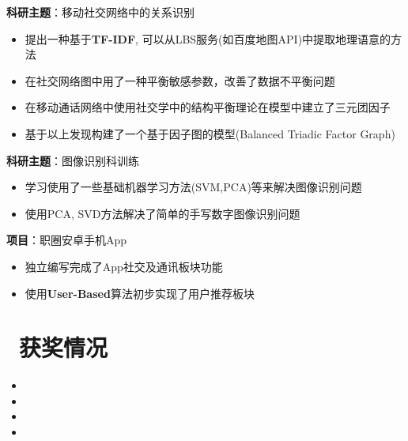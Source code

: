 \documentclass{resume}
\begin{document}
\textbf{科研主题}：移动社交网络中的关系识别
\begin{itemize}
\item 提出一种基于\textbf{TF-IDF}, 可以从LBS服务(如百度地图API)中提取地理语意的方法
\item 在社交网络图中用了一种平衡敏感参数，改善了数据不平衡问题
\item 在移动通话网络中使用社交学中的结构平衡理论在模型中建立了三元团因子
\item 基于以上发现构建了一个基于因子图的模型(Balanced Triadic Factor Graph)
\end{itemize}

\textbf{科研主题}：图像识别科训练
\begin{itemize}
\item 学习使用了一些基础机器学习方法(SVM,PCA)等来解决图像识别问题
\item 使用PCA, SVD方法解决了简单的手写数字图像识别问题
\end{itemize}

\textbf{项目}：职圈安卓手机App
\begin{itemize}
\item 独立编写完成了App社交及通讯板块功能
\item 使用\textbf{User-Based}算法初步实现了用户推荐板块
\end{itemize}



\section{\faHeartO\ 获奖情况}
\begin{itemize}
\item {}
\item {}
\item {}
\item {}
\end{itemize}

%
%
\end{document}
